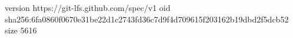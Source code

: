 version https://git-lfs.github.com/spec/v1
oid sha256:6fa0860f0670e31be22d1c2743fd36c7d9f4d709615f203162b19dbd2f5dcb52
size 5616
